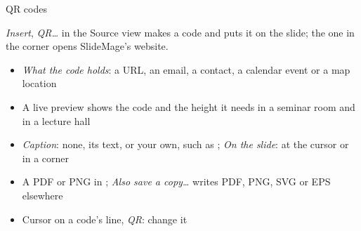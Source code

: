 
\begin{standardframe}{QR codes}
	\begin{minipage}[t]{0.66\linewidth}
		\small\SMLineTop
		\emph{Insert}, \emph{QR\ldots} in the Source view
		makes a code and puts it on the slide; the one in the
		corner opens SlideMage's website.
		\par\smallskip
		\begin{itemize}
			\item \emph{What the code holds}: a URL, an email, a contact, a calendar event or a map location
			\item A live preview shows the code and the height it needs in a seminar room and in a lecture hall
			\item \emph{Caption}: none, its text, or your own, such as ; \emph{On the slide}: at the cursor or in a corner
			\item A PDF or PNG in ; \emph{Also save a copy\ldots} writes PDF, PNG, SVG or EPS elsewhere
			\item Cursor on a code's line, \emph{QR}: change it
		\end{itemize}
	\end{minipage}
\end{standardframe}
